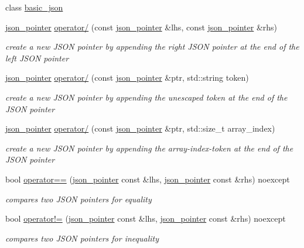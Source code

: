 \begin{DoxyCompactItemize}
\item 
class \mbox{\hyperlink{classnlohmann_1_1json__pointer_ada3100cdb8700566051828f1355fa745}{basic\+\_\+json}}
\item 
\mbox{\hyperlink{classnlohmann_1_1json__pointer}{json\+\_\+pointer}} \mbox{\hyperlink{classnlohmann_1_1json__pointer_a90a11fe6c7f37b1746a3ff9cb24b0d53}{operator/}} (const \mbox{\hyperlink{classnlohmann_1_1json__pointer}{json\+\_\+pointer}} \&lhs, const \mbox{\hyperlink{classnlohmann_1_1json__pointer}{json\+\_\+pointer}} \&rhs)
\begin{DoxyCompactList}\small\item\em create a new J\+S\+ON pointer by appending the right J\+S\+ON pointer at the end of the left J\+S\+ON pointer \end{DoxyCompactList}\item 
\mbox{\hyperlink{classnlohmann_1_1json__pointer}{json\+\_\+pointer}} \mbox{\hyperlink{classnlohmann_1_1json__pointer_a926c9065dbed1bedc17857a813f7a46f}{operator/}} (const \mbox{\hyperlink{classnlohmann_1_1json__pointer}{json\+\_\+pointer}} \&ptr, std\+::string token)
\begin{DoxyCompactList}\small\item\em create a new J\+S\+ON pointer by appending the unescaped token at the end of the J\+S\+ON pointer \end{DoxyCompactList}\item 
\mbox{\hyperlink{classnlohmann_1_1json__pointer}{json\+\_\+pointer}} \mbox{\hyperlink{classnlohmann_1_1json__pointer_a9f6bc6f4d4668b4e9a19d8b8ac29da4f}{operator/}} (const \mbox{\hyperlink{classnlohmann_1_1json__pointer}{json\+\_\+pointer}} \&ptr, std\+::size\+\_\+t array\+\_\+index)
\begin{DoxyCompactList}\small\item\em create a new J\+S\+ON pointer by appending the array-\/index-\/token at the end of the J\+S\+ON pointer \end{DoxyCompactList}\item 
bool \mbox{\hyperlink{classnlohmann_1_1json__pointer_a4667ef558c8c3f8a646bfda0c6654653}{operator==}} (\mbox{\hyperlink{classnlohmann_1_1json__pointer}{json\+\_\+pointer}} const \&lhs, \mbox{\hyperlink{classnlohmann_1_1json__pointer}{json\+\_\+pointer}} const \&rhs) noexcept
\begin{DoxyCompactList}\small\item\em compares two J\+S\+ON pointers for equality \end{DoxyCompactList}\item 
bool \mbox{\hyperlink{classnlohmann_1_1json__pointer_a6779edcf28e6f018a3bbb29c0b4b5e1e}{operator!=}} (\mbox{\hyperlink{classnlohmann_1_1json__pointer}{json\+\_\+pointer}} const \&lhs, \mbox{\hyperlink{classnlohmann_1_1json__pointer}{json\+\_\+pointer}} const \&rhs) noexcept
\begin{DoxyCompactList}\small\item\em compares two J\+S\+ON pointers for inequality \end{DoxyCompactList}\end{DoxyCompactItemize}


